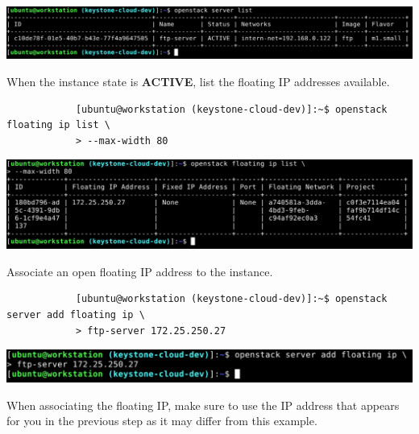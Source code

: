 \documentclass[letterpaper, 12pt]{article}
\begin{document}
\begin{enumerate}
\begin{labstep}
        \begin{center}
            \includegraphics[width=\linewidth]{images/part2/step2.png}
        \end{center}
    \end{labstep}

    \begin{labstep}
        When the instance state is \textbf{ACTIVE}, list the floating IP addresses available.
        \begin{lstlisting}
            [ubuntu@workstation (keystone-cloud-dev)]:~$ openstack floating ip list \
            > --max-width 80
        \end{lstlisting}

        \begin{center}
            \includegraphics[width=\linewidth]{images/part2/step3.png}
        \end{center}
    \end{labstep}

    \begin{labstep}
        Associate an open floating IP address to the instance.
        \begin{lstlisting}
            [ubuntu@workstation (keystone-cloud-dev)]:~$ openstack server add floating ip \
            > ftp-server 172.25.250.27
        \end{lstlisting}

        \begin{center}
            \includegraphics[width=\linewidth]{images/part2/step4.png}
        \end{center}
    \end{labstep}

    \begin{notebox}
        When associating the floating IP, make sure to use the IP address that appears for you in the previous step as it may differ from this example.
    \end{notebox}


\end{enumerate}
\end{document}
